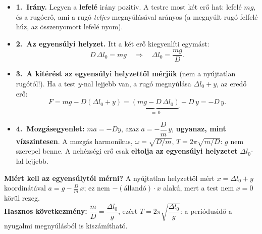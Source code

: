 \documentclass[12pt]{article}
\begin{document}
\begin{minipage}[t]{0.57\linewidth}\vspace{0pt}
\begin{itemize}
  \item \textbf{1.\ Irány.} Legyen a \textbf{lefelé} irány pozitív. A testre most két erő hat:
    lefelé $mg$, és a rugóerő, ami a rugó \emph{teljes} megnyúlásával arányos (a megnyúlt rugó
    felfelé húz, az összenyomott lefelé nyom).
  \item \textbf{2.\ Az egyensúlyi helyzet.} Itt a két erő kiegyenlíti egymást:
    \[ D\,\Delta l_0 = m g \quad\Longrightarrow\quad \Delta l_0 = \frac{mg}{D} . \]
  \item \textbf{3.\ A kitérést az egyensúlyi helyzettől mérjük} (nem a nyújtatlan rugótól!).
    Ha a test $y$-nal lejjebb van, a rugó megnyúlása $\Delta l_0 + y$, az eredő erő:
    \[ F = mg - D(\Delta l_0 + y) = \underbrace{(mg - D\,\Delta l_0)}_{=\,0} - D\,y = -D\,y . \]
  \item \textbf{4.\ Mozgásegyenlet:} $ma = -Dy$, azaz $a = -\dfrac{D}{m}\,y$, \textbf{ugyanaz,
    mint vízszintesen}. A mozgás harmonikus, $\omega = \sqrt{D/m}$, \;$T = 2\pi\sqrt{m/D}$:
    $g$ nem szerepel benne. A nehézségi erő csak \textbf{eltolja az egyensúlyi helyzetet}
    $\Delta l_0$-lal lejjebb.
\end{itemize}
\begin{fontos}
\textbf{Miért kell az egyensúlytól mérni?} A nyújtatlan helyzettől mért $x = \Delta l_0 + y$
koordinátával $a = g - \tfrac{D}{m}\,x$; ez nem $-(\text{állandó})\cdot x$ alakú, mert a test
nem $x = 0$ körül rezeg.\\[3pt]
\textbf{Hasznos következmény:} $\dfrac{m}{D} = \dfrac{\Delta l_0}{g}$, ezért
$T = 2\pi\sqrt{\dfrac{\Delta l_0}{g}}$: a periódusidő a nyugalmi megnyúlásból is kiszámítható.
\end{fontos}
\end{minipage}\hfill
\end{document}
